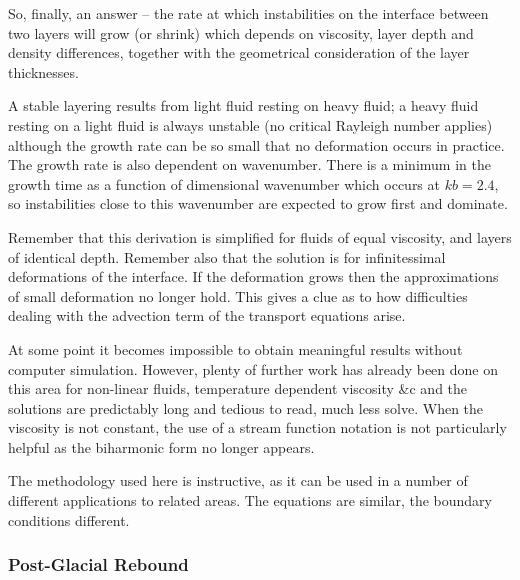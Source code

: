 \documentclass[10pt]{article}
\begin{document}
	So, finally, an answer -- the rate at which instabilities on the interface between two
	layers will grow (or shrink) which depends on viscosity, layer depth and density differences, 
	together with the geometrical consideration of the layer thicknesses.  

	A stable layering results from light fluid resting on heavy fluid; a heavy fluid
	resting on a light fluid is always unstable (no critical Rayleigh number applies)
	although the growth rate can be so small that no deformation occurs in practice.
	The growth rate is also dependent on wavenumber. There is a minimum in the 
	growth time as a function of dimensional wavenumber which occurs at $k b = 2.4$, so
	instabilities close to this wavenumber are expected to grow first and dominate.
	
	Remember that this
	derivation is simplified for fluids of equal viscosity, and layers of identical depth. 
	Remember also that the solution is for {\rm infinitessimal} deformations of the 
	interface. If the deformation grows then the approximations of small deformation
	no longer hold. This gives a clue as to how difficulties dealing with the advection
	term of the transport equations arise.
	
	At some point it becomes impossible to obtain meaningful results without 
	computer simulation. However, plenty of
	further work has already been done on this area for non-linear fluids, temperature dependent viscosity
	\&c and the solutions are predictably long and tedious to read, much less solve. When the viscosity
	is not constant, the use of a stream function notation is not particularly helpful as the biharmonic
	form no longer appears.

	
	The methodology used here is instructive, as it can be used in a number of different applications
	to related areas. The equations are similar, the boundary conditions different.
		
	\subsubsection{Post-Glacial Rebound}	
	
\end{document}

